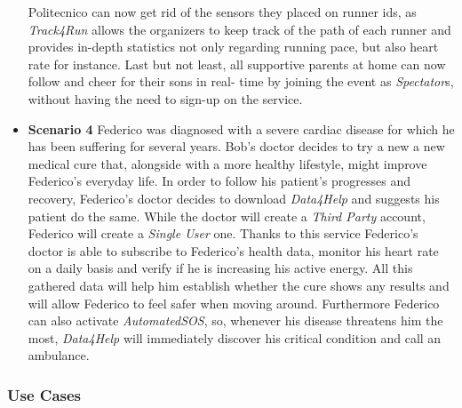 \documentclass[titlepage]{article}
\begin{document}
\begin{itemize}
					Politecnico can now get rid of the sensors they placed on runner ids, as {\it Track4Run} allows the 						organizers to keep track of the path of each runner and provides in-depth statistics not only 						regarding running pace, but also heart rate for instance. 
					Last but not least, all supportive parents at home can now follow and cheer for their sons in real-					time by joining the event as {\it Spectator}s, without having the need to sign-up on the service.
					\item {\bf Scenario 4} \linebreak
					Federico was diagnosed with a severe cardiac disease for which he has been suffering for several 					years. Bob’s doctor decides to try a new a new medical cure that, alongside with a more healthy 					lifestyle, might improve Federico’s everyday life. In order to follow his patient’s progresses and 						recovery, Federico’s doctor decides to download {\it Data4Help} and suggests his patient do the same. 					While the doctor will create a {\it Third Party} account, Federico will create a {\it Single User} one. Thanks to 					this service Federico’s doctor is able to subscribe to Federico’s health data, monitor his heart rate 					on a daily basis and verify if he is increasing his active energy. All this gathered data will help him 					establish whether the cure shows any results and will allow Federico to feel safer when moving 					around. Furthermore Federico can also activate {\it AutomatedSOS}, so, whenever his disease 						threatens him the most, {\it Data4Help} will immediately discover his critical condition and call an 						ambulance.
				\end{itemize}	
			
		\subsubsection{Use Cases}
		
		
\end{document}
